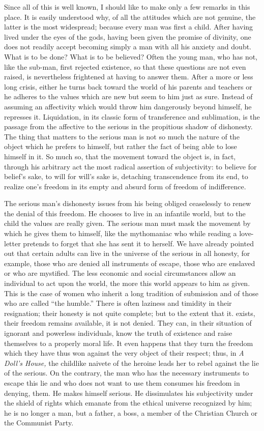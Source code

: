 \documentclass[11pt]{article}
\begin{document}
Since all of this is well known, I should like to make only a few remarks in this place. It is easily understood why, of all the attitudes which are not genuine, the latter is the most widespread; because every man was first a child. After having lived under the eyes of the gods, having been given the promise of divinity, one does not readily accept becoming simply a man with all his anxiety and doubt. What is to be done? What is to be believed? Often the young man, who has not, like the sub-man, first rejected existence, so that these questions are not even raised, is nevertheless frightened at having to answer them. After a more or less long crisis, either he turns back toward the world of his parents and teachers or he adheres to the values which are new but seem to him just as sure. Instead of assuming an affectivity which would throw him dangerously beyond himself, he represses it. Liquidation, in its classic form of transference and sublimation, is the passage from the affective to the serious in the propitious shadow of dishonesty. The thing that matters to the serious man is not so much the nature of the object which he prefers to himself, but rather the fact of being able to lose himself in it. So much so, that the movement toward the object is, in fact, through his arbitrary act the most radical assertion of subjectivity: to believe for belief’s sake, to will for will’s sake is, detaching transcendence from its end, to realize one’s freedom in its empty and absurd form of freedom of indifference.

The serious man’s dishonesty issues from his being obliged ceaselessly to renew the denial of this freedom. He chooses to live in an infantile world, but to the child the values are really given. The serious man must mask the movement by which he gives them to himself, like the mythomaniac who while reading a love-letter pretends to forget that she has sent it to herself. We have already pointed out that certain adults can live in the universe of the serious in all honesty, for example, those who are denied all instruments of escape, those who are enslaved or who are mystified. The less economic and social circumstances allow an individual to act upon the world, the more this world appears to him as given. This is the case of women who inherit a long tradition of submission and of those who are called “the humble.” There is often laziness and timidity in their resignation; their honesty is not quite complete; but to the extent that it. exists, their freedom remains available, it is not denied. They can, in their situation of ignorant and powerless individuals, know the truth of existence and raise themselves to a properly moral life. It even happens that they turn the freedom which they have thus won against the very object of their respect; thus, in \textit{A Doll’s House,} the childlike naivete of the heroine leads her to rebel against the lie of the serious. On the contrary, the man who has the necessary instruments to escape this lie and who does not want to use them consumes his freedom in denying, them. He makes himself serious. He dissimulates his subjectivity under the shield of rights which emanate from the ethical universe recognized by him; he is no longer a man, but a father, a boss, a member of the Christian Church or the Communist Party.
\end{document}
